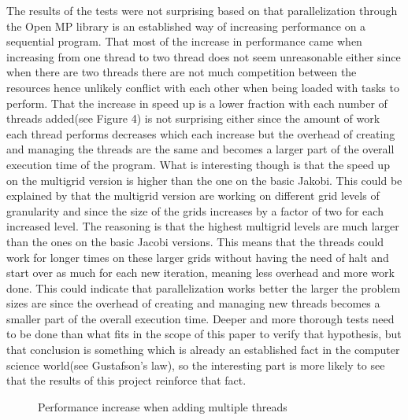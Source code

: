 \documentclass{article}
\begin{document}
The results of the tests were not surprising based on that parallelization through the Open MP library is an established way of increasing performance on a sequential program. That most of the increase in performance came when increasing from one thread to two thread does not seem unreasonable either since when there are two threads there are not much competition between the resources hence unlikely conflict with each other when being loaded with tasks to perform. That the increase in speed up is a lower fraction with each number of threads added(see Figure 4) is not surprising either since the amount of work each thread performs decreases which each increase but the overhead of creating and managing the threads are the same and becomes a larger part of the overall execution time of the program. What is interesting though is that the speed up on the multigrid version is higher than the one on the basic Jakobi. This could be explained by that the multigrid version are working on different grid levels of granularity and since the size of the grids increases by a factor of two for each increased level. The reasoning is that the highest multigrid levels are much larger than the ones on the basic Jacobi versions. This means that the threads could work for longer times on these larger grids without having the need of halt and start over as much for each new iteration, meaning less overhead and more work done. This could indicate that parallelization works better the larger the problem sizes are since the overhead of creating and managing new threads becomes a smaller part of the overall execution time. Deeper and more thorough tests need to be done than what fits in the scope of this paper to verify that hypothesis, but that conclusion is something which is already an established fact in the computer science world(see Gustafson’s law), so the interesting part is more likely to see that the results of this project reinforce that fact. 

\begin{figure}
\hspace{4em}
\caption{Performance increase when adding multiple threads}
\end{figure}
\end{document}
